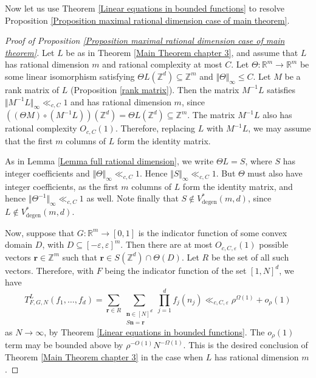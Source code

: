 \documentclass[12pt,a4paper,twoside,reqno]{amsart}
\newcommand{\degen}{\operatorname{degen}}
\numberwithin{equation}{section}
\begin{document}
Now let us use Theorem \ref{Linear equations in bounded functions} to resolve Proposition \ref{Proposition maximal rational dimension case of main theorem}. 

\begin{proof}[Proof of Proposition \ref{Proposition maximal rational dimension case of main theorem}]
Let $L$ be as in Theorem \ref{Main Theorem chapter 3}, and assume that $L$ has rational dimension $m$ and rational complexity at most $C$. Let $\Theta:\mathbb{R}^m\longrightarrow \mathbb{R}^m$ be some linear isomorphism satisfying $\Theta L(\mathbb{Z}^d) \subseteq \mathbb{Z}^m$ and $\Vert \Theta \Vert_\infty \leqslant C$. Let $M$ be a rank matrix of $L$ (Proposition \ref{rank matrix}). Then the matrix $M^{-1}L$ satisfies $\Vert M^{-1} L\Vert_\infty \ll_{c,C} 1$ and has rational dimension $m$, since \\$((\Theta M )\circ (M^{-1}L))(\mathbb{Z}^d) = \Theta L(\mathbb{Z}^d) \subseteq \mathbb{Z}^m$. The matrix $M^{-1}L$ also has rational complexity $O_{c,C}(1)$. Therefore, replacing $L$ with $M^{-1} L$, we may assume that the first $m$ columns of $L$ form the identity matrix.

As in Lemma \ref{Lemma full rational dimension}, we write $\Theta L = S$, where $S$ has integer coefficients and $\Vert \Theta \Vert_\infty \ll_{c,C} 1$. Hence $\Vert S\Vert_\infty \ll_{c,C}1$. But $\Theta$ must also have integer coefficients, as the first $m$ columns of $L$ form the identity matrix, and hence $\Vert \Theta^{-1} \Vert _\infty \ll_{c,C} 1$ as well. Note finally that $S \notin V_{\degen}^*(m,d)$, since $L \notin V_{\degen}^*(m,d)$.

Now, suppose that $G:\mathbb{R}^m \longrightarrow [0,1]$ is the indicator function of some convex domain $D$, with $D \subseteq [-\varepsilon,\varepsilon]^m$. Then there are at most $O_{c,C,\varepsilon}(1)$ possible vectors $\mathbf{r} \in \mathbb{Z}^m$ such that $\mathbf{r} \in S(\mathbb{Z}^d) \cap \Theta(D).$ Let $R$ be the set of all such vectors.  Therefore, with $F$ being the indicator function of the set $[1,N]^d$, we have
 \begin{equation}
 T_{F,G,N}^L(f_1,\dots,f_d) = \sum\limits_{\mathbf{r} \in R} \sum\limits_{\substack{\mathbf{n} \in [N]^d \\ S\mathbf{n} = \mathbf{r}}}  \prod\limits_{j=1}^d f_j(n_j) \ll_{c,C,\varepsilon} \rho^{\Omega(1)} + o_{\rho}(1)
\end{equation}
\noindent as $N\rightarrow \infty$, by Theorem \ref{Linear equations in bounded functions}. The $o_{\rho}(1)$ term may be bounded above by $\rho^{-O(1)} N^{-\Omega(1)}$. This is the desired conclusion of Theorem \ref{Main Theorem chapter 3} in the case when $L$ has rational dimension $m$. 
\end{proof}
\end{document}
